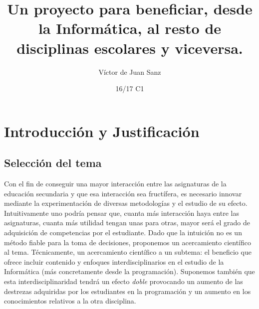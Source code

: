 \documentclass[palatino,miniheader]{apuntesURJC}
\title{Un proyecto para beneficiar, desde la Informática, al resto de disciplinas escolares y viceversa.}
\author{Víctor de Juan Sanz}
\date{16/17 C1}
\begin{document}
\pagestyle{plain}
\maketitle

\tableofcontents
\newpage





\chapter{Introducción y Justificación}
\section{Selección del tema}

Con el fin de conseguir una mayor interacción entre las asignaturas de la educación secundaria y que esa interacción sea fructífera, es necesario innovar mediante la experimentación de diversas metodologías y el estudio de su efecto.
%
Intuitivamente uno podría pensar que, cuanta más interacción haya entre las asignaturas, cuanta más utilidad tengan unas para otras, mayor será el grado de adquisición de competencias por el estudiante.
%
Dado que la intuición no es un método fiable para la toma de decisiones, proponemos un acercamiento científico al tema. 
%
Técnicamente, un acercamiento científico a un subtema: el beneficio que ofrece incluir contenido y enfoques interdisciplinarios en el estudio de la Informática (más concretamente desde la programación).
%
Suponemos también que esta interdisciplinaridad tendrá un efecto \textit{doble} provocando un aumento de las destrezas adquiridas por los estudiantes en la programación y un aumento en los conocimientos relativos a la otra disciplina.
\end{document}
